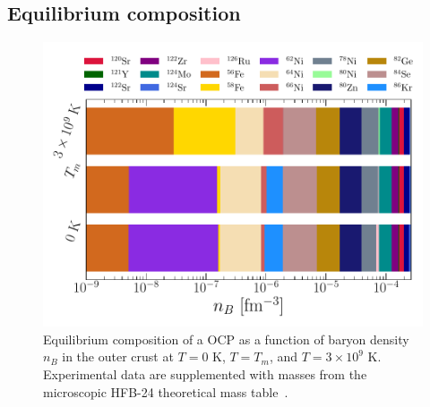 \subsection{Equilibrium composition}\label{subsec:compo_ocrust_tm}

\begin{figure}[!t]
  \begin{center}
    \includegraphics[width=\linewidth]{figures/ocrust_compo_vs_temp.pdf}
  \end{center}
  \caption[Equilibrium OCP composition versus baryon density in the outer crust 
  at finite temperature]{Equilibrium composition of a OCP as a function of 
    baryon density $n_B$ in the outer crust at $T=0$ \si{\kelvin}, $T=T_m$, and 
    $T=3\times 10^9$ \si{\kelvin}. 
  Experimental data are supplemented with masses from the microscopic HFB-24 
  theoretical mass table~\cite{Goriely2013}.}\label{fig:ocrust_compo_vs_temp}
\end{figure}

